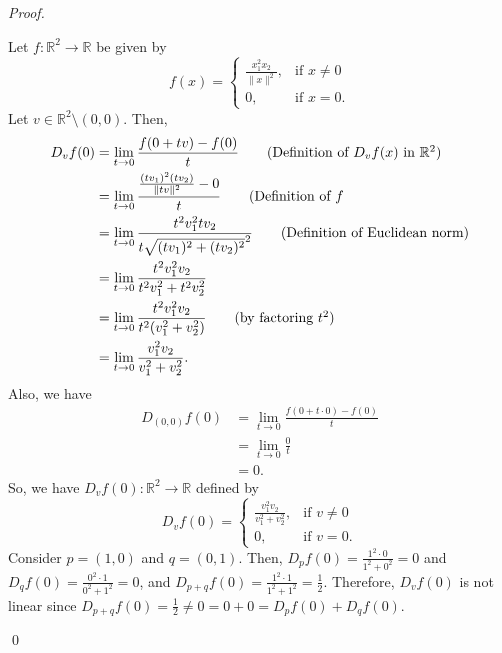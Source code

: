 \documentclass[12pt]{article}
\newenvironment{sol}
    {\emph{Proof.}
    }
    {
    \qed
    }
\begin{document}
\begin{sol}
Let $f: \mathbb{R}^2 \to \mathbb{R}$ be given by $$f(x) = \begin{cases} 
     \frac{x_1^2 x_2}{\lVert x \rVert^2}, & \text{if } x \neq 0 \\
      0, & \text{if } x = 0. 
   \end{cases}
$$ Let $v \in \mathbb{R}^2 \setminus (0, 0)$. Then, \begin{align*}
    D_vf(0) &= \lim_{t \to 0} \frac{f(0 + tv) - f(0)}{t} \tag*{(Definition of $D_vf(x)$ in $\mathbb{R}^2$)} \\ &= \lim_{t \to 0} \frac{\frac{(tv_1)^2(tv_2)}{\lVert tv \rVert^2} - 0}{t} \tag*{(Definition of $f$} \\ &= \lim_{t \to 0} \frac{t^2v_1^2tv_2}{t\sqrt{(tv_1)^2+(tv_2)^2}^2} \tag*{(Definition of Euclidean norm)} \\ &= \lim_{t \to 0} \frac{t^2v_1^2v_2}{t^2v_1^2 + t^2v_2^2} \\ &= \lim_{t \to 0} \frac{t^2v_1^2v_2}{t^2(v_1^2 + v_2^2)} \tag*{(by factoring $t^2$)} \\ &= \lim_{t \to 0} \frac{v_1^2v_2}{v_1^2 + v_2^2}.
\end{align*}
Also, we have \begin{align*}
    D_{(0, 0)}f(0) &= \lim_{t \to 0} \frac{f(0 + t \cdot 0) - f(0)}{t} \\ &= \lim_{t \to 0} \frac{0}{t} \\ &= 0.
\end{align*}
So, we have $D_vf(0):\mathbb{R}^2 \to \mathbb{R}$ defined by $$D_vf(0) = \begin{cases} 
     \frac{v_1^2 v_2}{v_1^2 + v_2^2}, & \text{if } v \neq 0 \\
      0, & \text{if } v = 0. 
   \end{cases}$$
Consider $p = (1, 0)$ and $q = (0, 1)$. Then, $D_pf(0) = \frac{1^2 \cdot 0}{1^2 + 0^2} = 0$ and $D_qf(0) = \frac{0^2 \cdot 1}{0^2 + 1^2} = 0$, and $D_{p + q}f(0) = \frac{1^2 \cdot 1}{1^2 + 1^2} = \frac{1}{2}$. Therefore, $D_vf(0)$ is not linear since $D_{p + q}f(0) = \frac{1}{2} \neq 0 = 0 + 0 = D_pf(0) + D_qf(0)$.
\end{sol}
\end{document}
